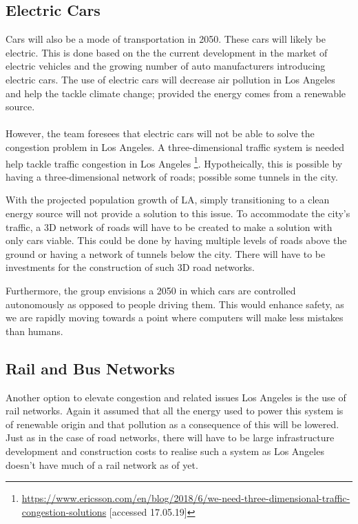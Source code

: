 \subsection{Electric Cars}
Cars will also be a mode of transportation in 2050. These cars will likely be electric. This is done based on the the current development in the market of electric vehicles and the growing number of auto manufacturers introducing electric cars. The use of electric cars will decrease air pollution in Los Angeles and help the tackle climate change; provided the energy comes from a renewable source. \\\\
However, the team foresees that electric cars will not be able to solve the congestion problem in Los Angeles. A three-dimensional traffic system is needed help tackle traffic congestion in Los Angeles \footnote{\url{https://www.ericsson.com/en/blog/2018/6/we-need-three-dimensional-traffic-congestion-solutions} [accessed 17.05.19]}. Hypotheically, this is possible by having a three-dimensional network of roads; possible some tunnels in the city.   




With the projected population growth of LA, simply transitioning to a clean energy source will not provide a solution to this issue. To accommodate the city's traffic, a 3D network of roads will have to be created to make a solution with only cars viable. This could be done by having multiple levels of roads above the ground or having a network of tunnels below the city. There will have to be investments for the construction of such 3D road networks. 

Furthermore, the group envisions a 2050 in which cars are controlled autonomously as opposed to people driving them. This would enhance safety, as we are rapidly moving towards a point where computers will make less mistakes than humans.

\subsection{Rail and Bus Networks}
Another option to elevate congestion and related issues Los Angeles is the use of rail networks. Again it assumed that all the energy used to power this system is of renewable origin and that pollution as a consequence of this will be lowered. Just as in the case of road networks, there will have to be large infrastructure development and construction costs to realise such a system as Los Angeles doesn't have much of a rail network as of yet. 


